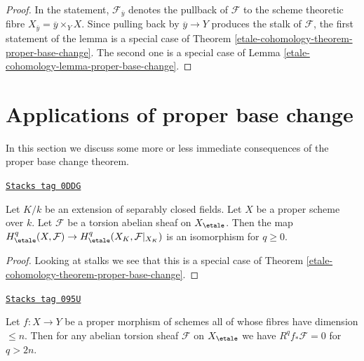 \begin{proof}
In the statement, $\mathcal{F}_{\overline{y}}$ denotes the pullback
of $\mathcal{F}$ to the scheme theoretic fibre
$X_{\overline{y}} = \overline{y} \times_Y X$.
Since pulling back by $\overline{y} \to Y$ produces the
stalk of $\mathcal{F}$, the first statement of the lemma
is a special case of Theorem \ref{etale-cohomology-theorem-proper-base-change}.
The second one is a special case of Lemma \ref{etale-cohomology-lemma-proper-base-change}.
\end{proof}

\section{Applications of proper base change}
\label{etale-cohomology-section-applications-proper-base-change}
In this section we discuss some more or less immediate
consequences of the proper base change theorem.

\begin{lemma}
\label{etale-cohomology-lemma-base-change-separably-closed}
\href{https://stacks.math.columbia.edu/tag/0DDG}{\texttt{Stacks tag 0DDG}}

Let $K/k$ be an extension of separably closed fields.
Let $X$ be a proper scheme over $k$.
Let $\mathcal{F}$ be a torsion abelian sheaf on $X_\etale$.
Then the map $H^q_\etale(X, \mathcal{F}) \to
H^q_\etale(X_K, \mathcal{F}|_{X_K})$ is an isomorphism
for $q \geq 0$.
\end{lemma}

\begin{proof}
Looking at stalks we see that
this is a special case of
Theorem \ref{etale-cohomology-theorem-proper-base-change}.
\end{proof}

\begin{lemma}
\label{etale-cohomology-lemma-cohomological-dimension-proper}
\href{https://stacks.math.columbia.edu/tag/095U}{\texttt{Stacks tag 095U}}

Let $f : X \to Y$ be a proper morphism of schemes
all of whose fibres have dimension $\leq n$.
Then for any abelian torsion sheaf $\mathcal{F}$ on $X_\etale$
we have $R^qf_*\mathcal{F} = 0$ for $q > 2n$.
\end{lemma}

